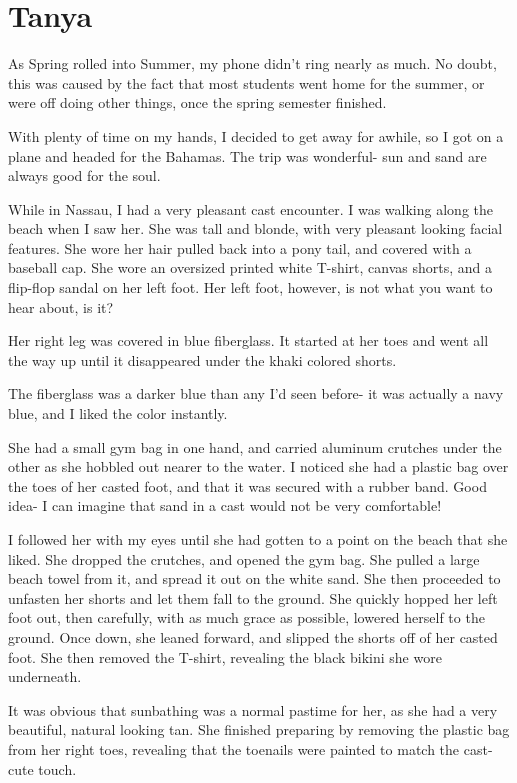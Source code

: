 \chapter{Tanya}
As Spring rolled into Summer, my phone didn't ring nearly as much. No doubt, this was caused
by the fact that most students went home for the summer, or were off doing other things, once
the spring semester finished.

With plenty of time on my hands, I decided to get away for awhile, so I got on a plane and
headed for the Bahamas. The trip was wonderful- sun and sand are always good for the soul.

While in Nassau, I had a very pleasant cast encounter. I was walking along the beach when I
saw her. She was tall and blonde, with very pleasant looking facial features. She wore her hair
pulled back into a pony tail, and covered with a baseball cap. She wore an oversized printed
white T-shirt, canvas shorts, and a flip-flop sandal on her left foot. Her left foot, however,
is not what you want to hear about, is it?

Her right leg was covered in blue fiberglass. It started at her toes and went all the way up
until it disappeared under the khaki colored shorts.

The fiberglass was a darker blue than any I'd seen before- it was actually a navy blue, and
I liked the color instantly.

She had a small gym bag in one hand, and carried aluminum crutches under the other as she
hobbled out nearer to the water. I noticed she had a plastic bag over the toes of her casted
foot, and that it was secured with a rubber band. Good idea- I can imagine that sand in a cast
would not be very comfortable!

I followed her with my eyes until she had gotten to a point on the beach that she liked. She
dropped the crutches, and opened the gym bag. She pulled a large beach towel from it, and spread
it out on the white sand. She then proceeded to unfasten her shorts and let them fall to the
ground. She quickly hopped her left foot out, then carefully, with as much grace as possible,
lowered herself to the ground. Once down, she leaned forward, and slipped the shorts off of her
casted foot. She then removed the T-shirt, revealing the black bikini she wore underneath.

It was obvious that sunbathing was a normal pastime for her, as she had a very beautiful,
natural looking tan. She finished preparing by removing the plastic bag from her right toes,
revealing that the toenails were painted to match the cast- cute touch.

